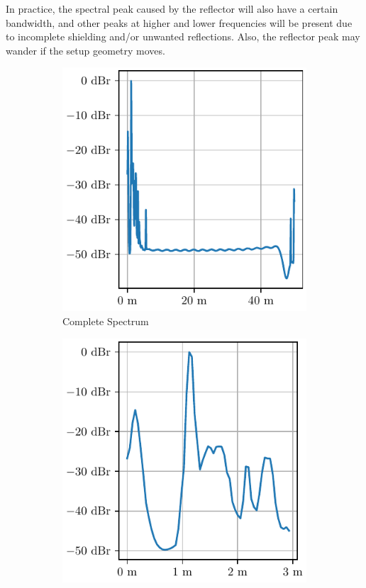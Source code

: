 In practice, the spectral peak caused by the reflector will also have a certain bandwidth,
and other peaks at higher and lower frequencies will be present due to incomplete shielding and/or unwanted reflections.
Also, the reflector peak may wander if the setup geometry moves.

\begin{figure}[h]
    \centering
    \begin{subfigure}[t]{.45\textwidth}
        \centering
        \includegraphics[width=\textwidth]{../figures/interference.pdf}
        \caption{Complete Spectrum}
    \end{subfigure}
    \begin{subfigure}[t]{.45\textwidth}
        \centering
        \includegraphics[width=\textwidth]{../figures/interference_zoom.pdf}

\end{subfigure}
\end{figure}
